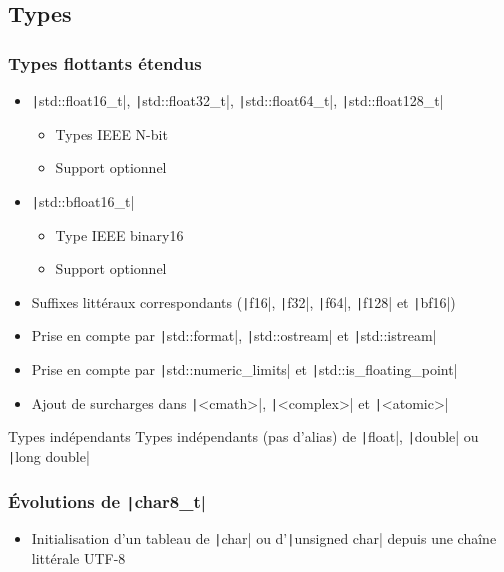 \documentclass[C++.tex]{subfiles}
\begin{document}
\subsection*{Types}
\begin{frame}[fragile]
	\frametitle{Types flottants étendus}
	\begin{itemize}
		\item \texttt|std::float16_t|, \texttt|std::float32_t|, \texttt|std::float64_t|, \texttt|std::float128_t|
		\begin{itemize}
			\item Types IEEE N-bit
			\item Support optionnel
		\end{itemize}
		\item \texttt|std::bfloat16_t|
		\begin{itemize}
			\item Type IEEE binary16
			\item Support optionnel
		\end{itemize}
		\item Suffixes littéraux correspondants (\texttt|f16|, \texttt|f32|, \texttt|f64|, \texttt|f128| et \texttt|bf16|)
		\item Prise en compte par \texttt|std::format|, \texttt|std::ostream| et \texttt|std::istream|
		\item Prise en compte par \texttt|std::numeric_limits| et \texttt|std::is_floating_point|
		\item Ajout de surcharges dans \texttt|<cmath>|, \texttt|<complex>| et \texttt|<atomic>|
	\end{itemize}

	\begin{alertblock}{Types indépendants}
		Types indépendants (pas d'alias) de \texttt|float|, \texttt|double| ou \texttt|long double|
	\end{alertblock}
\end{frame}

\begin{frame}[fragile]
	\frametitle{Évolutions de \texttt|char8_t|}
	\begin{itemize}
		\item Initialisation d'un tableau de \texttt|char| ou d'\texttt|unsigned char| depuis une chaîne littérale UTF-8
	\end{itemize}
\end{frame}
\end{document}
